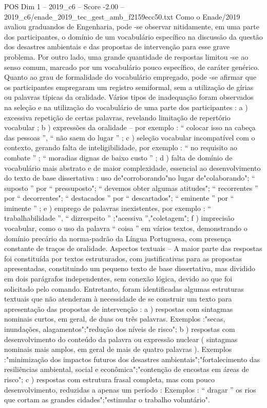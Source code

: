 \begin{textsample}{POS Dim 1 – 2019\_c6 – Score -2.00 – 2019\_c6/enade\_2019\_tec\_gest\_amb\_f2159ecc50.txt}
Como o Enade/2019 avaliou graduandos de Engenharia, pode -se observar nitidamente, em uma parte dos participantes, o domínio de um vocabulário específico na discussão da questão dos desastres ambientais e das propostas de intervenção para esse grave problema.
Por outro lado, uma grande quantidade de respostas limitou -se ao senso comum, marcado por um vocabulário pouco específico, de caráter genérico.
Quanto ao grau de formalidade do vocabulário empregado, pode -se afirmar que os participantes empregaram um registro semiformal, sem a utilização de gírias ou palavras típicas da oralidade.
Vários tipos de inadequação foram observados na seleção e na utilização do vocabulário de uma parte dos participantes : a ) excessiva repetição de certas palavras, revelando limitação de repertório vocabular ; b ) expressões da oralidade – por exemplo : “ colocar isso na cabeça das pessoas ”, “ não saem do lugar ” ; c ) seleção vocabular incompatível com o contexto, gerando falta de inteligibilidade, por exemplo : “ no requisito ao combate ” ; “ moradias dignas de baixo custo ” ; d ) falta de domínio de vocabulário mais abstrato e de maior complexidade, essencial ao desenvolvimento do texto de base dissertativa : uso de"corroborando"no lugar de"colaborando"; “ suposto ” por “ pressuposto"; “ devemos obter algumas atitudes"; “ recorrentes ” por “ decorrentes"; “ destacados ” por “ descartados"; “ eminente ” por “ iminente ” ; e ) emprego de palavras inexistentes, por exemplo : “ trabalhabilidade ”, “ dizrespeito ” ;"acessiva ”,"coletagem"; f ) imprecisão vocabular, como o uso da palavra “ coisa ” em vários textos, demonstrando o domínio precário da norma-padrão da Língua Portuguesa, com presença constante de traços de oralidade.
Aspectos textuais – A maior parte das respostas foi constituída por textos estruturados, com justificativas para as propostas apresentadas, constituindo um pequeno texto de base dissertativa, mas dividido em dois parágrafos independentes, sem conexão lógica, devido ao que foi solicitado pelo comando.
Entretanto, foram identificadas algumas estruturas textuais que não atenderam à necessidade de se construir um texto para apresentação das propostas de intervenção : a ) respostas com sintagmas nominais curtos, em geral, de duas ou três palavras.
Exemplos :"secas, inundações, alagamentos";"redução dos níveis de risco"; b ) respostas com desenvolvimento do conteúdo da palavra ou expressão nuclear ( sintagmas nominais mais amplos, em geral de mais de quatro palavras ).
Exemplos :"minimização dos impactos futuros dos desastres ambientais";"fortalecimento das resiliências ambiental, social e econômica";"contenção de encostas em áreas de risco"; c ) respostas com estrutura frasal completa, mas com pouco desenvolvimento, reduzidas a apenas um período : Exemplos : “ dragar ” os rios que cortam as grandes cidades";"estimular o trabalho voluntário".

\end{textsample}
